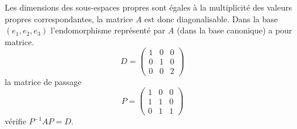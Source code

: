 {{Les dimensions des sous-espaces propres sont \'egales \`a la multiplicit\'e des valeurs propres correspondantes, la matrice $A$ est donc diagonalisable.
Dans la base $(e_1, e_2, e_3)$ l'endomorphisme repr\'esent\'e par $A$ (dans la base canonique) a pour matrice.
$$D=\begin{pmatrix}1&0&0 \\  0&1&0 \\  0&0&2\end{pmatrix}$$
la matrice de passage $$P=\begin{pmatrix}1&0&0 \\  1&1&0 \\  0&1&1\end{pmatrix}$$ v\'erifie $P^{-1}AP=D$.
}
}
